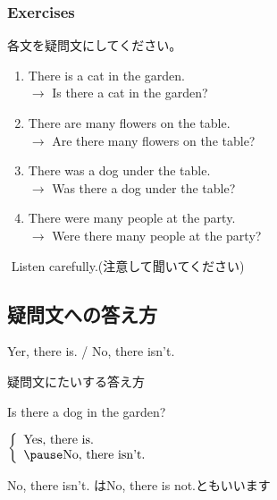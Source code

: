 \documentclass[aspectratio=169]{beamer}
\newcommand{\myaudio}[1]{\href{#1}{\faVolumeUp}}
\begin{document}
\begin{frame}[plain]\frametitle{Exercises}
各文を疑問文にしてください。\pause

  \begin{enumerate}
   \item There is a cat in the garden.\\
         \pause
         $\longrightarrow$ Is there a cat in the garden?\pause
   \item There are many flowers on the table.\\
         \pause
         $\longrightarrow$ Are there many flowers on the table?\pause
   \item There was a dog under the table.\\
         \pause
         $\longrightarrow$ Was there a dog under the table?\pause
   \item There were many people at the party.\\
         \pause
         $\longrightarrow$ Were there many people at the party?\pause
  \end{enumerate}



\myaudio{audio/001_there_is_05.mp3}\,\,{}Listen carefully.(注意して聞いてください)


\end{frame}

\subsection{疑問文への答え方}
 \begin{frame}[plain]{Yer, there is. / No, there isn't.}
 \Large

疑問文にたいする答え方
\vspace{10pt}

\pause

Is there a dog in the garden?

\pause

$\left\{\begin{array}{l}
	 \text{Yes, there is.}\\\pause
         \text{No, there isn't.}
	\end{array}\right.$

\pause

\mbox{}\hfill{}{\small No, there isn't. はNo, there is not.ともいいます}
\end{frame}
\end{document}
